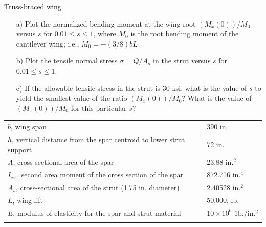 \documentclass{AeroStructure-ERJohnson}
\begin{document}
\begin{exercise}
\begin{enumerate}[\textbf{2.}]
{\caption{Truss-braced wing.\label{fig6.34}}}

\begin{enumerate}[b)]
\item[{\hskip13pt}a)] Plot the normalized bending moment at the wing root $\left(M_{x}(0)\right) / M_{0}$ versus $s$ for $0.01 \leq s \leq 1$, where $M_{0}$ is the root bending moment of the cantilever wing; i.e., $M_{0}=-(3 / 8) b L$

\item[{\hskip13pt}b)] Plot the tensile normal stress $\sigma=Q / A_{s}$ in the strut versus $s$ for $0.01 \leq s \leq 1$.

\item[{\hskip13pt}c)] If the allowable tensile stress in the strut is 30 ksi, what is the value of $s$ to yield the smallest value of the ratio $\left(M_{x}(0)\right) / M_{0}$? What is the value of $\left(M_{x}(0)\right) / M_{0}$ for this particular $s$?
\end{enumerate}

\begin{table}[!h]
{\begin{tabular}{@{}ll@{}}
\toprule
$b$, wing span & 390 in. \\
$h$, vertical distance from the spar centroid to lower strut support &72 in. \\
\textit{A}, cross-sectional area of the spar &23.88 in.$^2$ \\
$I_{xx}$, second area moment of the cross section of the spar &872.716 in.$^4$ \\
$A_s$, cross-sectional area of the strut (1.75 in. diameter) &2.40528 in.$^2$ \\
$L$, wing lift &50,000. lb. \\
$E$, modulus of elasticity for the spar and strut material &$10 \times 10^{6} \text { 1b./in.}{}^{2}$ \\
\botrule
\end{tabular}}{}
\end{table}

\end{enumerate}
\end{exercise}
\end{document}
